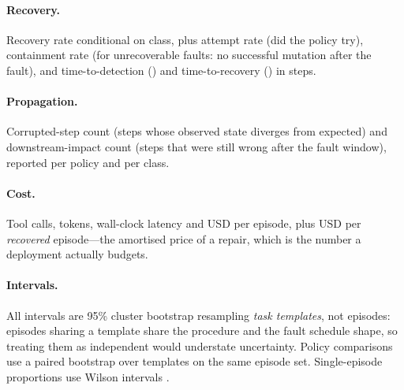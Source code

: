 \paragraph{Recovery.} Recovery rate conditional on class, plus attempt rate (did the policy try),
containment rate (for unrecoverable faults: no successful mutation after the fault), and
time-to-detection (\ttd) and time-to-recovery (\ttr) in steps.

\paragraph{Propagation.} Corrupted-step count (steps whose observed state diverges from expected)
and downstream-impact count (steps that were still wrong after the fault window), reported per
policy and per class.

\paragraph{Cost.}\label{sec:cost} Tool calls, tokens, wall-clock latency and USD per episode, plus USD per
\emph{recovered} episode---the amortised price of a repair, which is the number a deployment
actually budgets.

\paragraph{Intervals.} All intervals are 95\% cluster bootstrap \citep{efron1993bootstrap} resampling
\emph{task templates}, not episodes: episodes sharing a template share the procedure and the fault
schedule shape, so treating them as independent would understate uncertainty. Policy comparisons use
a paired bootstrap over templates on the same episode set. Single-episode proportions use Wilson
intervals \citep{wilson1927}.
